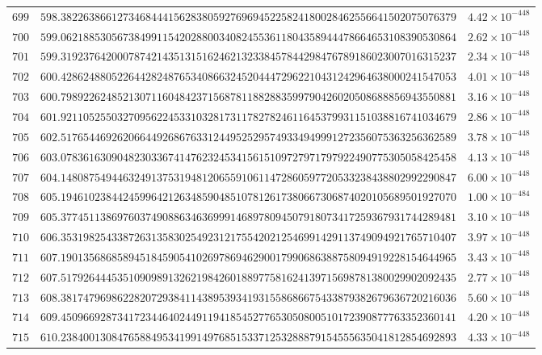 \documentclass[12pt,reqno]{amsart}
\theoremstyle{remark}
\begin{document}
\begin{longtable}{clc}
$699$ & $598.3822638661273468444156283805927696945225824180028462556641502075076379$ & $4.42\times 10^{-448}$ \\
$700$ & $599.0621885305673849911542028800340824553611804358944478664653108390530864$ & $2.62\times 10^{-448}$ \\
$701$ & $599.3192376420007874214351315162462132338457844298476789186023007016315237$ & $2.34\times 10^{-448}$ \\
$702$ & $600.4286248805226442824876534086632452044472962210431242964638000241547053$ & $4.01\times 10^{-448}$ \\
$703$ & $600.7989226248521307116048423715687811882883599790426020508688856943550881$ & $3.16\times 10^{-448}$ \\
$704$ & $601.9211052550327095622453310328173117827824611645379931151038816741034679$ & $2.86\times 10^{-448}$ \\
$705$ & $602.5176544692620664492686763312449525295749334949991272356075363256362589$ & $3.78\times 10^{-448}$ \\
$706$ & $603.0783616309048230336741476232453415615109727971797922490775305058425458$ & $4.13\times 10^{-448}$ \\
$707$ & $604.1480875494463249137531948120655910611472860597720533238438802992290847$ & $6.00\times 10^{-448}$ \\
$708$ & $605.1946102384424599642126348590485107812617380667306874020105689501927070$ & $1.00\times 10^{-484}$ \\
$709$ & $605.3774511386976037490886346369991468978094507918073417259367931744289481$ & $3.10\times 10^{-448}$ \\
$710$ & $606.3531982543387263135830254923121755420212546991429113749094921765710407$ & $3.97\times 10^{-448}$ \\
$711$ & $607.1901356868589451845905410269786946290017990686388758094919228154644965$ & $3.43\times 10^{-448}$ \\
$712$ & $607.5179264445351090989132621984260188977581624139715698781380029902092435$ & $2.77\times 10^{-448}$ \\
$713$ & $608.3817479698622820729384114389539341931558686675433879382679636720216036$ & $5.60\times 10^{-448}$ \\
$714$ & $609.4509669287341723446402449119418545277653050800510172390877763352360141$ & $4.20\times 10^{-448}$ \\
$715$ & $610.2384001308476588495341991497685153371253288879154555635041812854692893$ & $4.33\times 10^{-448}$ \\

\end{longtable}
\end{document}
